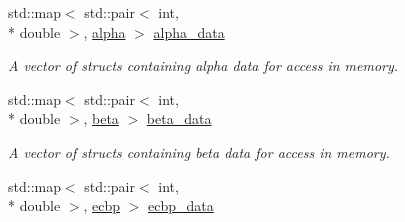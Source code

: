 \begin{DoxyCompactItemize}
\item 
\hypertarget{namespacepyne_a535b6ec192f55087092c07ee478bc11d}{std\-::map$<$ std\-::pair$<$ int, \\*
double $>$, \hyperlink{structpyne_1_1alpha}{alpha} $>$ \hyperlink{namespacepyne_a535b6ec192f55087092c07ee478bc11d}{alpha\-\_\-data}}\label{namespacepyne_a535b6ec192f55087092c07ee478bc11d}

\begin{DoxyCompactList}\small\item\em A vector of structs containing alpha data for access in memory. \end{DoxyCompactList}\item 
\hypertarget{namespacepyne_a5a5d547521d918978adccc01a8cdd10c}{std\-::map$<$ std\-::pair$<$ int, \\*
double $>$, \hyperlink{structpyne_1_1beta}{beta} $>$ \hyperlink{namespacepyne_a5a5d547521d918978adccc01a8cdd10c}{beta\-\_\-data}}\label{namespacepyne_a5a5d547521d918978adccc01a8cdd10c}

\begin{DoxyCompactList}\small\item\em A vector of structs containing beta data for access in memory. \end{DoxyCompactList}\item 
\hypertarget{namespacepyne_a43b4b8a8b73a5e966a55e14a270e98bf}{std\-::map$<$ std\-::pair$<$ int, \\*
double $>$, \hyperlink{structpyne_1_1ecbp}{ecbp} $>$ \hyperlink{namespacepyne_a43b4b8a8b73a5e966a55e14a270e98bf}{ecbp\-\_\-data}}\label{namespacepyne_a43b4b8a8b73a5e966a55e14a270e98bf}


\end{DoxyCompactItemize}
